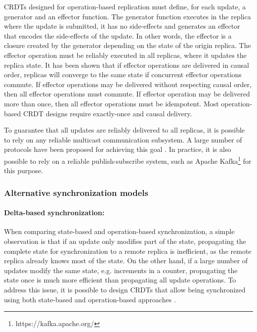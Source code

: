 \documentclass[12pt]{article}
\begin{document}
CRDTs designed for operation-based replication must define, for each update, 
a generator and an effector function. 
The generator function executes in the replica 
where the update is submitted, it has no side-effects and generates an effector 
that encodes the side-effects of the update. In other words, the effector is a 
closure created by the generator depending on the state of the origin replica.
The effector operation must be reliably executed in all replicas, where it
updates the replica state. 
It has been shown \cite{Shapiro11Conflict} that if effector operations are delivered
in causal order, replicas will converge to the same state if concurrent effector operations
commute.
If effector operations may be delivered without respecting causal order, then all 
effector operations must commute.
If effector operation may be delivered more than once, then all effector operations
must be idempotent.
Most operation-based CRDT designs require exactly-once and causal delivery. 

To guarantee that all updates are reliably delivered to 
all replicas, it is possible to rely on any reliable multicast communication 
subsystem.
A large number of protocols have been proposed for achieving this 
goal \cite{Chang84Reliable,Birman87Reliable,Demers87Epidemic}. 
In practice, it is also possible to rely on a reliable publish-subscribe 
system, such as Apache Kafka\footnote{https://kafka.apache.org/} for this purpose.

\subsubsection{Alternative synchronization models}

\paragraph{Delta-based synchronization:}
When comparing state-based and opera\-tion-based synchronization, a simple
observation is that if an update only modifies part of the state, 
propagating the complete state for synchronization to a remote replica is 
inefficient, as the remote replica already knows most of the state. 
On the other hand, if a large number of updates modify the same 
state, e.g. increments in a counter, propagating the state once is much more
efficient than propagating all update operations.
To address this issue, it is possible to design CRDTs that allow being 
synchronized using both state-based and operation-based approaches \cite{Bieniusa12Optimized}. 
\end{document}
